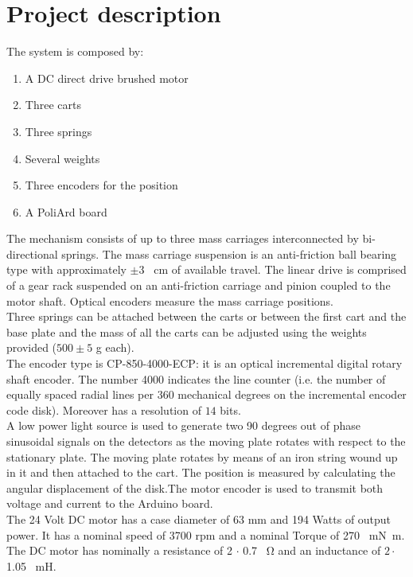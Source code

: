 \chapter{Project description}
The system is composed by:
\begin{enumerate}
\item A DC direct drive brushed motor
\item Three carts
\item Three springs
\item Several weights
\item Three encoders for the position
\item A PoliArd board
\end{enumerate}
The mechanism consists of up to three mass carriages interconnected by bi-directional springs. The mass carriage suspension is an anti-friction ball bearing type with approximately $\pm 3$ \SI{}{\cm} of available travel. The linear drive is comprised of a gear rack suspended on an anti-friction carriage and pinion coupled to the motor shaft. Optical encoders measure the mass carriage positions.\\

Three springs can be attached between the carts or between the first cart and the base plate and the mass of all the carts can be adjusted using the weights provided ($500 \pm 5$ g each).\\

The encoder type is CP-850-4000-ECP: it is an optical incremental digital rotary shaft encoder. The number 4000 indicates the line counter (i.e. the number of equally spaced radial lines per 360 mechanical degrees on the incremental encoder code disk). Moreover has a resolution of $14$ bits.\\A low power light source is used to generate two 90 degrees out of phase sinusoidal signals on the detectors as the moving plate rotates with respect to the stationary plate. The moving plate rotates by means of an iron string wound up in it and then attached to the cart. The position is measured by calculating the angular displacement of the disk.The motor encoder is used to transmit both voltage and current to the Arduino board. \\

The 24 Volt DC motor has a case diameter of 63 mm and 194 Watts of output power. It has a nominal speed of 3700 rpm and a nominal Torque of 270 \SI{}{\milli\newton \meter}. The DC motor has nominally a resistance of 2 $\cdot$ 0.7 \SI{}{\ohm} and an inductance of $2\cdot$ 1.05 \SI{}{\milli \henry}.\\

